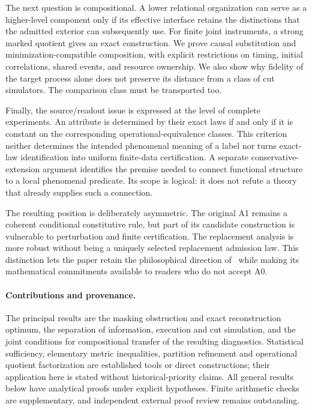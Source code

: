 The next question is compositional. A lower relational organization can serve as a higher-level component only if its effective interface retains the distinctions that the admitted exterior can subsequently use. For finite joint instruments, a strong marked quotient gives an exact construction. We prove causal substitution and minimization-compatible composition, with explicit restrictions on timing, initial correlations, shared events, and resource ownership. We also show why fidelity of the target process alone does not preserve its distance from a class of cut simulators. The comparison class must be transported too.

Finally, the source/readout issue is expressed at the level of complete experiments. An attribute is determined by their exact laws if and only if it is constant on the corresponding operational-equivalence classes. This criterion neither determines the intended phenomenal meaning of a label nor turns exact-law identification into uniform finite-data certification. A separate conservative-extension argument identifies the premise needed to connect functional structure to a local phenomenal predicate. Its scope is logical: it does not refute a theory that already supplies such a connection.

The resulting position is deliberately asymmetric. The original A1 remains a coherent conditional constitutive rule, but part of its candidate construction is vulnerable to perturbation and finite certification. The replacement analysis is more robust without being a uniquely selected replacement admission law. This distinction lets the paper retain the philosophical direction of \SPC\ while making its mathematical commitments available to readers who do not accept A0.

\paragraph{Contributions and provenance.}
The principal results are the masking obstruction and exact reconstruction optimum, the separation of information, execution and cut simulation, and the joint conditions for compositional transfer of the resulting diagnostics. Statistical sufficiency, elementary metric inequalities, partition refinement and operational quotient factorization are established tools or direct constructions; their application here is stated without historical-priority claims. All general results below have analytical proofs under explicit hypotheses. Finite arithmetic checks are supplementary, and independent external proof review remains outstanding.


